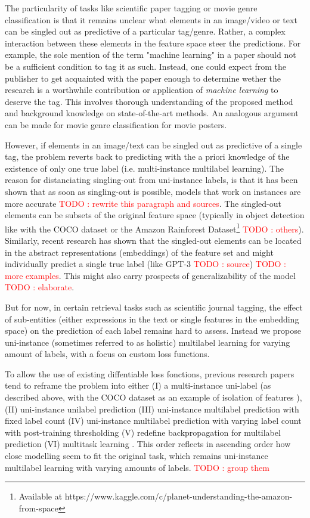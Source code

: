 \documentclass[sigconf,natbib,screen=true,review=true,anonymous]{acmart}
\newcommand\todo[1]{\textcolor{red}{TODO : #1}}
\begin{document}
The particularity of tasks like scientific paper tagging or movie genre classification is that it remains unclear what elements in an image/video or text can be singled out as predictive of a particular tag/genre. Rather, a complex interaction between these elements in the feature space steer the predictions. For example, the sole mention of the term "machine learning" in a paper should not be a sufficient condition to tag it as such. Instead, one could expect from the publisher to get acquainted with the paper enough to determine wether the research is a worthwhile contribution or application of \emph{machine learning} to deserve the tag. This involves thorough understanding of the proposed method and background knowledge on state-of-the-art methods. An analogous argument can be made for movie genre classification for movie posters.

However, if elements in an image/text can be singled out as predictive of a single tag, the problem reverts back to predicting with the a priori knowledge of the existence of only one true label (i.e. multi-instance multilabel learning).  The reason for distanciating singling-out from uni-instance labels, is that it has been shown that as soon as singling-out is possible, models that work on instances are more accurate \todo{rewrite this paragraph and sources}. The singled-out elements can be subsets of the original feature space (typically in object detection like with the COCO dataset  \cite{COCO} or the Amazon Rainforest Dataset\footnote{Available at https://www.kaggle.com/c/planet-understanding-the-amazon-from-space} \todo{others}). Similarly, recent research has shown that the singled-out elements can be located in the abstract representations (embeddings) of the feature set and might individually predict a single true label (like GPT-3 \todo{source}) \todo{more examples}. This might also carry prospects of generalizability of the model \cite{generalization} \todo{elaborate}. 

But for now, in certain retrieval tasks such as scientific journal tagging, the effect of sub-entities (either expressions in the text or single features in the embedding space) on the prediction of each label remains hard to assess. Instead we propose uni-instance (sometimes referred to as holistic) multilabel learning for varying amount of labels, with a focus on custom loss functions.

To allow the use of existing diffentiable loss fonctions, previous research papers tend to reframe the problem into either (I) a multi-instance uni-label (as described above, with the COCO dataset as an example of isolation of features \cite{COCO}), (II) uni-instance unilabel prediction (III) uni-instance multilabel prediction with fixed label count (IV) uni-instance multilabel prediction with varying label count with post-training thresholding (V) redefine backpropagation for multilabel prediction \cite{multilabelBackprop} (VI) multitask learning \cite{multitaskLabel}. This order reflects in ascending order how close modelling seem to fit the original task, which remains uni-instance multilabel learning with varying amounts of labels. \todo{group them}
\end{document}
